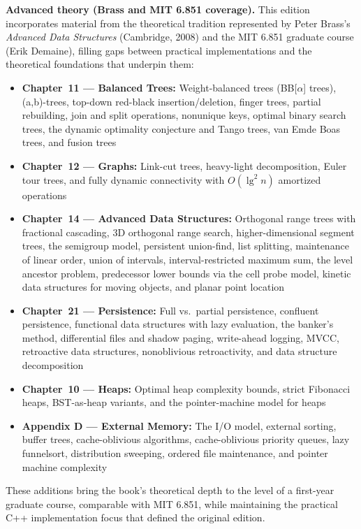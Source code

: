 \textbf{Advanced theory (Brass and MIT 6.851 coverage).} This edition incorporates material from the theoretical tradition represented by Peter Brass's \textit{Advanced Data Structures} (Cambridge, 2008) and the MIT 6.851 graduate course (Erik Demaine), filling gaps between practical implementations and the theoretical foundations that underpin them:
\begin{itemize}
\item \textbf{Chapter~11 — Balanced Trees:} Weight-balanced trees (BB[$\alpha$] trees), (a,b)-trees, top-down red-black insertion/deletion, finger trees, partial rebuilding, join and split operations, nonunique keys, optimal binary search trees, the dynamic optimality conjecture and Tango trees, van Emde Boas trees, and fusion trees
\item \textbf{Chapter~12 — Graphs:} Link-cut trees, heavy-light decomposition, Euler tour trees, and fully dynamic connectivity with $O(\lg^2 n)$ amortized operations
\item \textbf{Chapter~14 — Advanced Data Structures:} Orthogonal range trees with fractional cascading, 3D orthogonal range search, higher-dimensional segment trees, the semigroup model, persistent union-find, list splitting, maintenance of linear order, union of intervals, interval-restricted maximum sum, the level ancestor problem, predecessor lower bounds via the cell probe model, kinetic data structures for moving objects, and planar point location
\item \textbf{Chapter~21 — Persistence:} Full vs.\ partial persistence, confluent persistence, functional data structures with lazy evaluation, the banker's method, differential files and shadow paging, write-ahead logging, MVCC, retroactive data structures, nonoblivious retroactivity, and data structure decomposition
\item \textbf{Chapter~10 — Heaps:} Optimal heap complexity bounds, strict Fibonacci heaps, BST-as-heap variants, and the pointer-machine model for heaps
\item \textbf{Appendix D — External Memory:} The I/O model, external sorting, buffer trees, cache-oblivious algorithms, cache-oblivious priority queues, lazy funnelsort, distribution sweeping, ordered file maintenance, and pointer machine complexity
\end{itemize}

These additions bring the book's theoretical depth to the level of a first-year graduate course, comparable with MIT 6.851, while maintaining the practical C++ implementation focus that defined the original edition.

